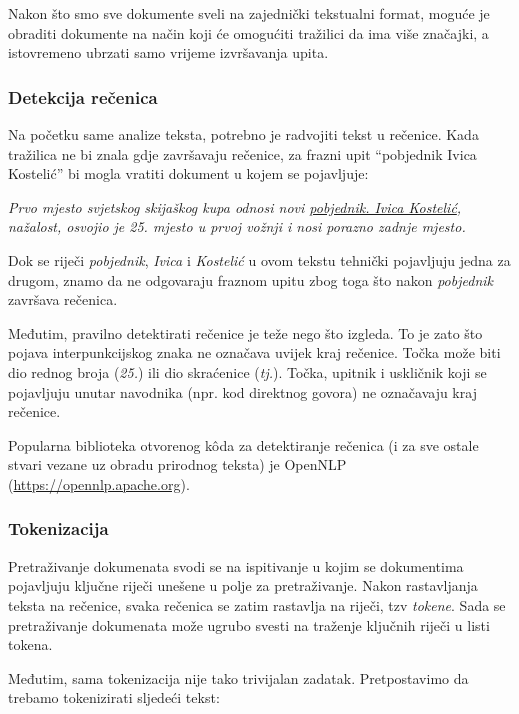 \documentclass[a4paper,twoside,12pt]{scrreprt}
\begin{document}
Nakon što smo sve dokumente sveli na zajednički tekstualni format, moguće je obraditi dokumente na način koji će omogućiti tražilici da ima više značajki, a istovremeno ubrzati samo vrijeme izvršavanja upita.

\subsubsection{Detekcija rečenica}

Na početku same analize teksta, potrebno je radvojiti tekst u rečenice. Kada tražilica ne bi znala gdje završavaju rečenice, za frazni upit ``pobjednik Ivica Kostelić'' bi mogla vratiti dokument u kojem se pojavljuje:

\begin{quoting}
  \textit{Prvo mjesto svjetskog skijaškog kupa odnosi novi \underline{pobjednik. Ivica Kostelić}, nažalost, osvojio je 25. mjesto u prvoj vožnji i nosi porazno zadnje mjesto.}
\end{quoting}

Dok se riječi \textit{pobjednik}, \textit{Ivica} i \textit{Kostelić} u ovom tekstu tehnički pojavljuju jedna za drugom, znamo da ne odgovaraju fraznom upitu zbog toga što nakon \textit{pobjednik} završava rečenica.

Međutim, pravilno detektirati rečenice je teže nego što izgleda. To je zato što pojava interpunkcijskog znaka ne označava uvijek kraj rečenice. Točka može biti dio rednog broja (\textit{25.}) ili dio skraćenice (\textit{tj.}). Točka, upitnik i uskličnik koji se pojavljuju unutar navodnika (npr. kod direktnog govora) ne označavaju kraj rečenice.

Popularna biblioteka otvorenog kôda za detektiranje rečenica (i za sve ostale stvari vezane uz obradu prirodnog teksta) je OpenNLP (\url{https://opennlp.apache.org}).

\subsubsection{Tokenizacija}

Pretraživanje dokumenata svodi se na ispitivanje u kojim se dokumentima pojavljuju ključne riječi unešene u polje za pretraživanje. Nakon rastavljanja teksta na rečenice, svaka rečenica se zatim rastavlja na riječi, tzv \textit{tokene}. Sada se pretraživanje dokumenata može ugrubo svesti na traženje ključnih riječi u listi tokena.

Međutim, sama tokenizacija nije tako trivijalan zadatak. Pretpostavimo da trebamo tokenizirati sljedeći tekst:
\end{document}

